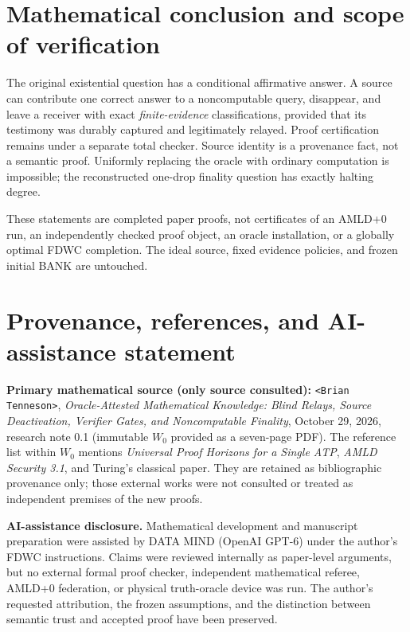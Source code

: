 \documentclass[11pt,letterpaper]{article}
\begin{document}
\section{Mathematical conclusion and scope of verification}
The original existential question has a conditional affirmative answer. A source can contribute one correct answer to a noncomputable query, disappear, and leave a receiver with exact \emph{finite-evidence} classifications, provided that its testimony was durably captured and legitimately relayed. Proof certification remains under a separate total checker. Source identity is a provenance fact, not a semantic proof. Uniformly replacing the oracle with ordinary computation is impossible; the reconstructed one-drop finality question has exactly halting degree.

These statements are completed paper proofs, not certificates of an AMLD+0 run, an independently checked proof object, an oracle installation, or a globally optimal FDWC completion. The ideal source, fixed evidence policies, and frozen initial BANK are untouched.

\section*{Provenance, references, and AI-assistance statement}
\noindent\textbf{Primary mathematical source (only source consulted):} \texttt{<Brian Tenneson>}, \emph{Oracle-Attested Mathematical Knowledge: Blind Relays, Source Deactivation, Verifier Gates, and Noncomputable Finality}, October 29, 2026, research note 0.1 (immutable $W_0$ provided as a seven-page PDF). The reference list within $W_0$ mentions \emph{Universal Proof Horizons for a Single ATP}, \emph{AMLD Security 3.1}, and Turing's classical paper. They are retained as bibliographic provenance only; those external works were not consulted or treated as independent premises of the new proofs.

\medskip\noindent\textbf{AI-assistance disclosure.} Mathematical development and manuscript preparation were assisted by DATA MIND (OpenAI GPT-6) under the author's FDWC instructions. Claims were reviewed internally as paper-level arguments, but no external formal proof checker, independent mathematical referee, AMLD+0 federation, or physical truth-oracle device was run. The author's requested attribution, the frozen assumptions, and the distinction between semantic trust and accepted proof have been preserved.
\end{document}
